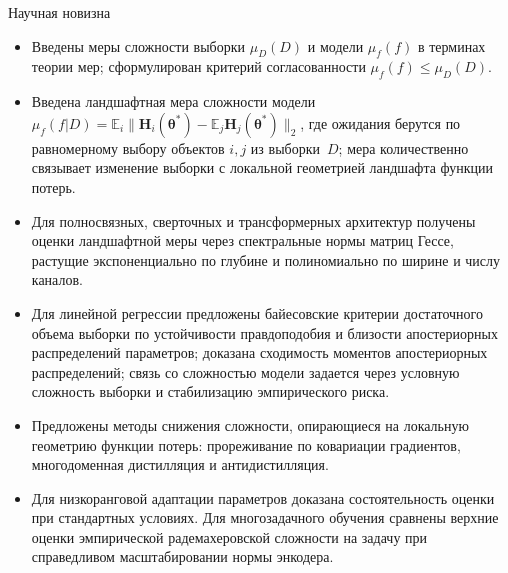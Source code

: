 \documentclass[10pt,pdf,hyperref={unicode}]{beamer}
\begin{document}
\begin{frame}{Научная новизна}
\justifying
\footnotesize
\begin{itemize}
    \justifying
    \item Введены меры сложности выборки $\mu_D(D)$ и модели $\mu_f(f)$ в терминах теории мер; сформулирован критерий согласованности $\mu_f(f) \le \mu_D(D)$.
    \item Введена ландшафтная мера сложности модели $\mu_f(f|D) = \mathbb{E}_{i}\big\|\mathbf{H}_{i}(\boldsymbol{\theta}^*)-\mathbb{E}_{j}\mathbf{H}_{j}(\boldsymbol{\theta}^*)\big\|_2$, где ожидания берутся по равномерному выбору объектов $i,j$ из выборки~$D$; мера количественно связывает изменение выборки с локальной геометрией ландшафта функции потерь.
    \item Для полносвязных, сверточных и трансформерных архитектур получены оценки ландшафтной меры через спектральные нормы матриц Гессе, растущие экспоненциально по глубине и полиномиально по ширине и числу каналов.
    \item Для линейной регрессии предложены байесовские критерии достаточного объема выборки по устойчивости правдоподобия и близости апостериорных распределений параметров; доказана сходимость моментов апостериорных распределений; связь со сложностью модели задается через условную сложность выборки и стабилизацию эмпирического риска.
    \item Предложены методы снижения сложности, опирающиеся на локальную геометрию функции потерь: прореживание по ковариации градиентов, многодоменная дистилляция и антидистилляция.
    \item Для низкоранговой адаптации параметров доказана состоятельность оценки при стандартных условиях. Для многозадачного обучения сравнены верхние оценки эмпирической радемахеровской сложности на задачу при справедливом масштабировании нормы энкодера.
\end{itemize}
\end{frame}
\end{document}
